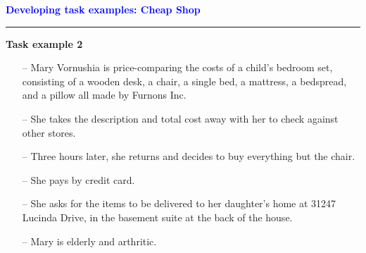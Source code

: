 \documentclass[pdf]{beamer}
\begin{document}
{
\begin{frame}
	\vspace{8mm}
	\textcolor{Blue}{\textbf{\Large{Developing task examples: Cheap Shop}}}
    \textcolor{red}{\rule{10cm}{1mm}}


    \bigskip
    \textbf{Task example 2}
    \bigskip
    \begin{itemize}
        \item[{--}] Mary Vornushia is price-comparing the costs of a child’s bedroom set, consisting of a wooden desk, a chair, a single bed, a mattress, a bedspread, and a pillow all made by Furnons Inc.
        \item[{--}] She takes the description and total cost away with her to check against other stores.
        \item[{--}] Three hours later, she returns and decides to buy everything but the chair.
        \item[{--}] She pays by credit card.
        \item[{--}] She asks for the items to be delivered to her daughter’s home at 31247 Lucinda Drive, in the basement suite at the back of the house.
        \bigskip
        \item[{--}] Mary is elderly and arthritic.
	\end{itemize}
\end{frame}}



\end{document}

